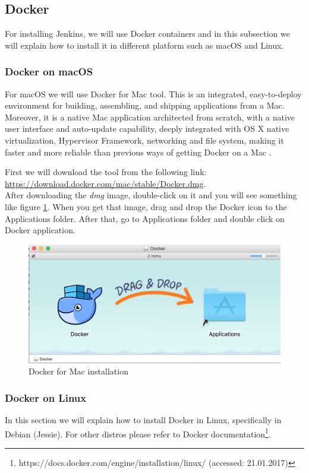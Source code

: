 \subsection{Docker}
For installing Jenkins, we will use Docker containers and in this subsection we will explain how to install it in different platform such as macOS and Linux.

\subsubsection{Docker on macOS}
For macOS we will use Docker for Mac tool. This is an integrated, easy-to-deploy environment for building, assembling, and shipping applications from a Mac. Moreover, it is a native Mac application architected from scratch, with a native user interface and auto-update capability, deeply integrated with OS X native virtualization, Hypervisor Framework, networking and file system, making it faster and more reliable than previous ways of getting Docker on a Mac \cite{Docker}.

First we will download the tool from the following link: \url{https://download.docker.com/mac/stable/Docker.dmg}.\\

After downloading the \textit{dmg} image, double-click on it and you will see something like figure \ref{fig:docker-mac-01}. When you get that image, drag and drop the Docker icon to the Applications folder. After that, go to Applications folder and double click on Docker application.

\begin{figure}[ht]
	\centering
    \includegraphics[width=\textwidth]{grafiken/docker-01}
    \caption{Docker for Mac installation}
    \label{fig:docker-mac-01}
\end{figure}

\subsubsection{Docker on Linux}
In this section we will explain how to install Docker in Linux, specifically in Debian (Jessie). For other distros please refer to Docker documentation\footnote{https://docs.docker.com/engine/installation/linux/ (accessed: 21.01.2017)}.

